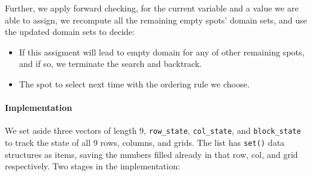 \documentclass[../main.tex]{subfiles}
\begin{document}
Further, we apply forward checking, for the current variable and a value we are able to assign, we recompute all the remaining empty spots' domain sets, and use the updated domain sets to decide:
\begin{itemize}
    \item If this assigment will lead to empty domain for any of other remaining spots, and if so, we terminate the search and backtrack.
    \item The spot to select next time with the ordering rule we choose. 
\end{itemize}
\paragraph{Implementation} We set aside three vectors of length 9,  \texttt{row\_state}, \texttt{col\_state}, and \texttt{block\_state} to track the state of all 9 rows, columns, and grids. The list has \texttt{set()} data structures as items, saving the numbers filled already in that row, col, and grid respectively. Two stages in the implementation:
\end{document}
